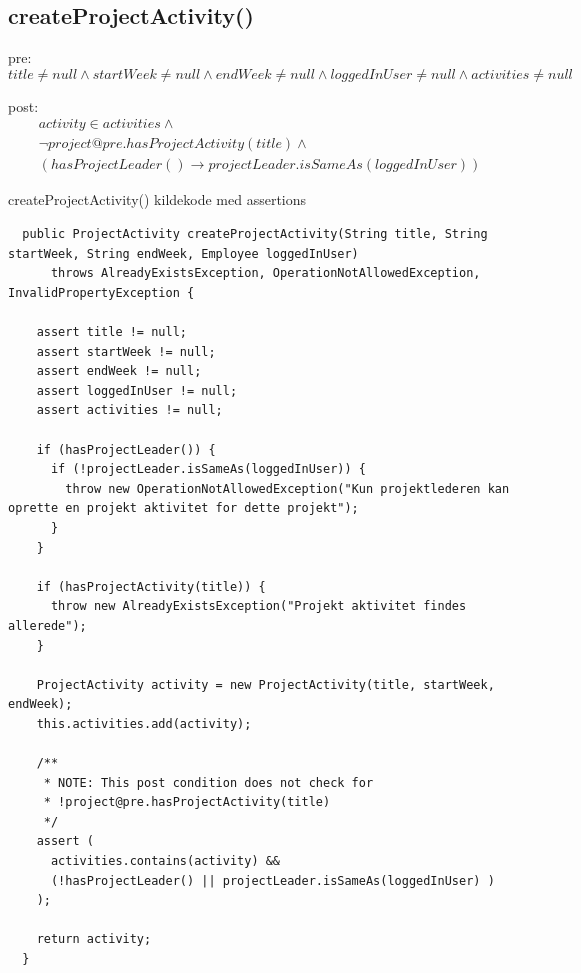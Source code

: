 \subsection{createProjectActivity()} \label{sec:contract_create_project_activity}
pre: 
\begin{equation}
    title \neq null \wedge startWeek \neq null \wedge endWeek \neq null \wedge loggedInUser \neq null \wedge activities \neq null
\end{equation}

post: 
\begin{equation}
\begin{gathered}
    activity \in activities \wedge \\
    \neg project@pre.hasProjectActivity(title) \wedge \\
    (hasProjectLeader() \to projectLeader.isSameAs(loggedInUser))
\end{gathered}
\end{equation}

\begin{listing}[H]
    \centering
    \caption{createProjectActivity() kildekode med assertions}\label{lst:create_project_activity_assertions}
    \begin{verbatim}
  public ProjectActivity createProjectActivity(String title, String startWeek, String endWeek, Employee loggedInUser)
      throws AlreadyExistsException, OperationNotAllowedException, InvalidPropertyException {

    assert title != null;
    assert startWeek != null;
    assert endWeek != null;
    assert loggedInUser != null;
    assert activities != null;

    if (hasProjectLeader()) {
      if (!projectLeader.isSameAs(loggedInUser)) {
        throw new OperationNotAllowedException("Kun projektlederen kan oprette en projekt aktivitet for dette projekt");
      }
    }

    if (hasProjectActivity(title)) {
      throw new AlreadyExistsException("Projekt aktivitet findes allerede");
    }

    ProjectActivity activity = new ProjectActivity(title, startWeek, endWeek);
    this.activities.add(activity);

    /**
     * NOTE: This post condition does not check for 
     * !project@pre.hasProjectActivity(title)
     */
    assert (
      activities.contains(activity) &&
      (!hasProjectLeader() || projectLeader.isSameAs(loggedInUser) )
    );

    return activity;
  }
    \end{verbatim}
\end{listing}


